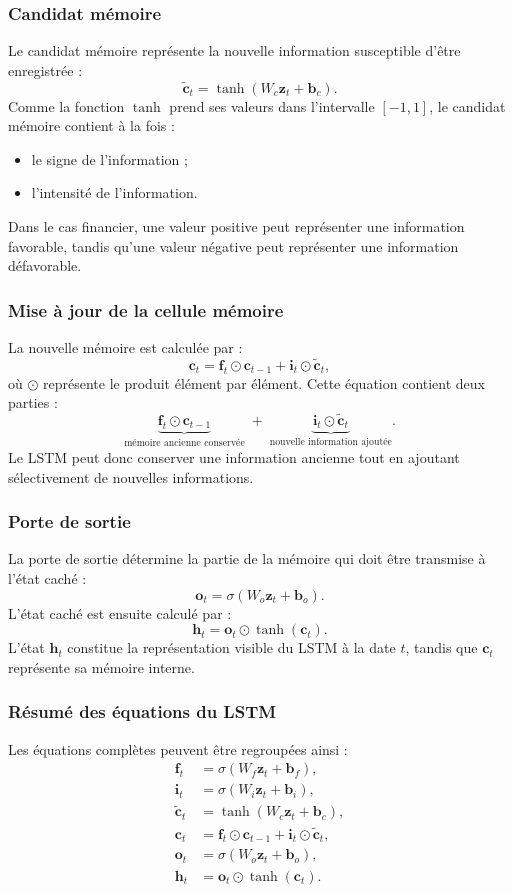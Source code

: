 \documentclass[11pt,a4paper]{article}
\renewcommand{\_}{\usorig\allowbreak}   %
\begin{document}
\subsubsection{Candidat mémoire}
Le candidat mémoire représente la nouvelle information susceptible d'être enregistrée :
\[
  \tilde{\bm c}_t = \tanh\left(W_c\bm z_t + \bm b_c\right).
\]
Comme la fonction $\tanh$ prend ses valeurs dans l'intervalle $[-1,1]$, le candidat
mémoire contient à la fois :
\begin{itemize}[nosep,label=---]
  \item le signe de l'information ;
  \item l'intensité de l'information.
\end{itemize}
Dans le cas financier, une valeur positive peut représenter une information favorable,
tandis qu'une valeur négative peut représenter une information défavorable.

\subsubsection{Mise à jour de la cellule mémoire}
La nouvelle mémoire est calculée par :
\[
  \bm c_t = \bm f_t\odot\bm c_{t-1} + \bm i_t\odot\tilde{\bm c}_t,
\]
où $\odot$ représente le produit élément par élément. Cette équation contient deux parties :
\[
  \underbrace{\bm f_t\odot\bm c_{t-1}}_{\text{mémoire ancienne conservée}}
  \;+\;
  \underbrace{\bm i_t\odot\tilde{\bm c}_t}_{\text{nouvelle information ajoutée}}.
\]
Le LSTM peut donc conserver une information ancienne tout en ajoutant sélectivement de
nouvelles informations.

\subsubsection{Porte de sortie}
La porte de sortie détermine la partie de la mémoire qui doit être transmise à l'état
caché :
\[
  \bm o_t = \sigma\left(W_o\bm z_t + \bm b_o\right).
\]
L'état caché est ensuite calculé par :
\[
  \bm h_t = \bm o_t\odot\tanh(\bm c_t).
\]
L'état $\bm h_t$ constitue la représentation visible du LSTM à la date $t$, tandis que
$\bm c_t$ représente sa mémoire interne.

\subsubsection{Résumé des équations du LSTM}
Les équations complètes peuvent être regroupées ainsi :
\begin{align}
  \bm f_t &= \sigma\left(W_f\bm z_t + \bm b_f\right),\\
  \bm i_t &= \sigma\left(W_i\bm z_t + \bm b_i\right),\\
  \tilde{\bm c}_t &= \tanh\left(W_c\bm z_t + \bm b_c\right),\\
  \bm c_t &= \bm f_t\odot\bm c_{t-1} + \bm i_t\odot\tilde{\bm c}_t,\\
  \bm o_t &= \sigma\left(W_o\bm z_t + \bm b_o\right),\\
  \bm h_t &= \bm o_t\odot\tanh(\bm c_t).
\end{align}
\end{document}
